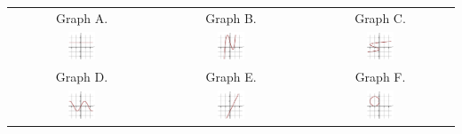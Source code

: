 \begin{enumerate}
\begin{center}
\begin{tabular}{ccc}
Graph A. & Graph B. & Graph C. \\
\includegraphics[width=0.2\textwidth]{img/chap1/sec1-2/prob3a.png} & \includegraphics[width=0.2\textwidth]{img/chap1/sec1-2/prob3b.png} &
\includegraphics[width=0.2\textwidth]{img/chap1/sec1-2/prob3c.png} \\
\midrule
Graph D. & Graph E. & Graph F. \\
\includegraphics[width=0.2\textwidth]{img/chap1/sec1-2/prob3d.png} & \includegraphics[width=0.2\textwidth]{img/chap1/sec1-2/prob3e.png} &
\includegraphics[width=0.2\textwidth]{img/chap1/sec1-2/prob3f.png} \\
\end{tabular}
\end{center}


\end{enumerate}
